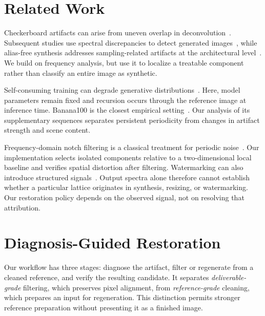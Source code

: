\documentclass[sigplan,10pt,nonacm]{acmart}
\begin{document}
\section{Related Work}
Checkerboard artifacts can arise from uneven overlap in deconvolution~\cite{odena}. Subsequent studies use spectral discrepancies to detect generated images~\cite{durall,dzanic,frank,corvi}, while alias-free synthesis addresses sampling-related artifacts at the architectural level~\cite{karras}. We build on frequency analysis, but use it to localize a treatable component rather than classify an entire image as synthetic.

Self-consuming training can degrade generative distributions~\cite{mad,collapse}. Here, model parameters remain fixed and recursion occurs through the reference image at inference time. Banana100 is the closest empirical setting~\cite{banana100,banana100data}. Our analysis of its supplementary sequences separates persistent periodicity from changes in artifact strength and scene content.

Frequency-domain notch filtering is a classical treatment for periodic noise~\cite{gonzalez}. Our implementation selects isolated components relative to a two-dimensional local baseline and verifies spatial distortion after filtering. Watermarking can also introduce structured signals~\cite{treering,stablesig}. Output spectra alone therefore cannot establish whether a particular lattice originates in synthesis, resizing, or watermarking. Our restoration policy depends on the observed signal, not on resolving that attribution.

\section{Diagnosis-Guided Restoration}
\label{sec:mitigation}
Our workflow has three stages: diagnose the artifact, filter or regenerate from a cleaned reference, and verify the resulting candidate. It separates \emph{deliverable-grade} filtering, which preserves pixel alignment, from \emph{reference-grade} cleaning, which prepares an input for regeneration. This distinction permits stronger reference preparation without presenting it as a finished image.
\end{document}
